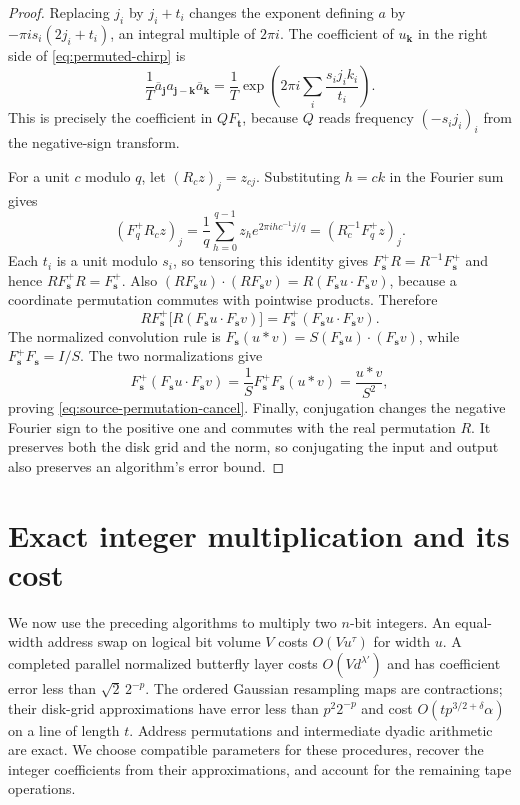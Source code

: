 \documentclass[11pt]{article}
\theoremstyle{definition}
\begin{document}
\begin{proof}
Replacing $j_i$ by $j_i+t_i$ changes the exponent defining $a$ by
$-\pi i s_i(2j_i+t_i)$, an integral multiple of $2\pi i$.
The coefficient of $u_{\boldsymbol k}$ in the right side of
\eqref{eq:permuted-chirp} is
\[
 \frac1T\overline a_{\boldsymbol j}
               a_{\boldsymbol j-\boldsymbol k}
               \overline a_{\boldsymbol k}
 =\frac1T\exp\left(2\pi i\sum_i
                       \frac{s_i j_i k_i}{t_i}\right).
\]
This is precisely the coefficient in $QF_{\boldsymbol t}$, because
$Q$ reads frequency $(-s_i j_i)_i$ from the negative-sign transform.

For a unit $c$ modulo $q$, let $(R_cz)_j=z_{cj}$. Substituting $h=ck$
in the Fourier sum gives
\[
 (F_q^+R_cz)_j
 =\frac1q\sum_{h=0}^{q-1}z_h e^{2\pi i h c^{-1}j/q}
 =(R_c^{-1}F_q^+z)_j.
\]
Each $t_i$ is a unit modulo $s_i$, so tensoring this identity gives
$F_{\boldsymbol s}^+R=R^{-1}F_{\boldsymbol s}^+$ and hence
$RF_{\boldsymbol s}^+R=F_{\boldsymbol s}^+$. Also
$(RF_{\boldsymbol s}u)\mathbin{\cdot}(RF_{\boldsymbol s}v)
=R(F_{\boldsymbol s}u\mathbin{\cdot}F_{\boldsymbol s}v)$,
because a coordinate permutation commutes with pointwise products.
Therefore
\[
 RF_{\boldsymbol s}^+\bigl[R(F_{\boldsymbol s}u\mathbin{\cdot}
                                       F_{\boldsymbol s}v)\bigr]
 =F_{\boldsymbol s}^+(F_{\boldsymbol s}u\mathbin{\cdot}
                                       F_{\boldsymbol s}v).
\]
The normalized convolution rule is
$F_{\boldsymbol s}(u*v)=S(F_{\boldsymbol s}u)\mathbin{\cdot}
(F_{\boldsymbol s}v)$, while
$F_{\boldsymbol s}^+F_{\boldsymbol s}=I/S$. The two normalizations give
\[
 F_{\boldsymbol s}^+
   (F_{\boldsymbol s}u\mathbin{\cdot}F_{\boldsymbol s}v)
 =\frac1S F_{\boldsymbol s}^+F_{\boldsymbol s}(u*v)
 =\frac{u*v}{S^2},
\]
proving \eqref{eq:source-permutation-cancel}. Finally, conjugation
changes the negative Fourier sign to the positive one and commutes with
the real permutation $R$. It preserves both the disk grid and the norm,
so conjugating the input and output also preserves an algorithm's error
bound.
\end{proof}
 \section{Exact integer multiplication and its cost}
\label{sec:assembly}

We now use the preceding algorithms to multiply two $n$-bit integers.
An equal-width address swap on logical bit volume $V$ costs
$O(Vu^\tau)$ for width $u$.  A completed parallel normalized butterfly
layer costs $O(Vd^{\lambda'})$ and has coefficient error less than
$\sqrt2\,2^{-p}$.  The ordered Gaussian resampling maps are
contractions; their disk-grid approximations have error less than
$p^2 2^{-p}$ and cost $O(tp^{3/2+\delta}\alpha)$ on a line of length
$t$.  Address permutations and intermediate dyadic arithmetic are
exact.  We choose compatible parameters for these procedures, recover
the integer coefficients from their approximations, and account for the
remaining tape operations.
\end{document}
